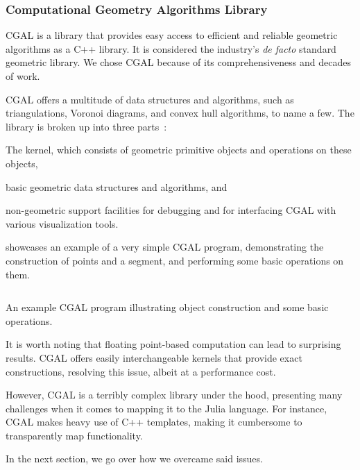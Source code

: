 \subsubsection{Computational Geometry Algorithms Library}%
\label{sec:solution.impl.cgal}

\Ac{CGAL} is a library that provides easy access to efficient and reliable
geometric algorithms as a C++ library.  It is considered the industry's
\textit{de facto} standard geometric library.  We chose \ac{CGAL} because of its
comprehensiveness and decades of work.

\ac{CGAL} offers a multitude of data structures and algorithms, such as
triangulations, Voronoi diagrams, and convex hull algorithms, to name a few.
The library is broken up into three parts~\cite{CGAL:5.3:23LGK}:
\begin{enumerate*}
  \item The kernel, which consists of geometric primitive objects and operations
  on these objects,
  \item basic geometric data structures and algorithms, and
  \item non-geometric support facilities for debugging and for interfacing
  \ac{CGAL} with various visualization tools.
\end{enumerate*}

 showcases an example of a very simple
\ac{CGAL} program, demonstrating the construction of points and a segment, and
performing some basic operations on them.

\begin{listing}[htbp]
  \inputminted{cpp}{cpp/points_and_segments.cpp}
  \caption[CGAL: Three points and one segment]{
    An example CGAL program illustrating object construction and some
    basic operations.}\label{lst:solution.impl.cgal.pas}
\end{listing}

It is worth noting that floating point-based computation can lead to surprising
results.  \Ac{CGAL} offers easily interchangeable kernels that provide
exact constructions, resolving this issue, albeit at a performance cost.

However, \ac{CGAL} is a terribly complex library under the hood, presenting many
challenges when it comes to mapping it to the Julia language.  For instance,
\ac{CGAL} makes heavy use of C++ templates, making it cumbersome to
transparently map functionality.

In the next section, we go over how we overcame said issues.
